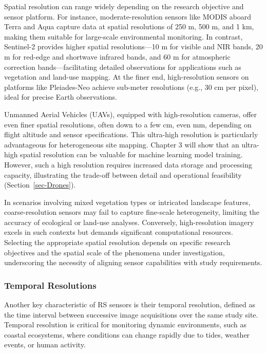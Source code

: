 \documentclass[
  letterpaper,
  11pt,
  english,
  singlespacing,
  headsepline]{MastersDoctoralThesis}
\begin{document}
\begin{spacing}{1.5}
Spatial resolution can range widely depending on the research objective
and sensor platform. For instance, moderate-resolution sensors like
MODIS aboard Terra and Aqua capture data at spatial resolutions of 250
m, 500 m, and 1 km, making them suitable for large-scale environmental
monitoring. In contrast, Sentinel-2 provides higher spatial
resolutions---10 m for visible and NIR bands, 20 m for red-edge and
shortwave infrared bands, and 60 m for atmospheric correction
bands---facilitating detailed observations for applications such as
vegetation and land-use mapping. At the finer end, high-resolution
sensors on platforms like Pleiades-Neo achieve sub-meter resolutions
(e.g., 30 cm per pixel), ideal for precise Earth observations.

Unmanned Aerial Vehicles (UAVs), equipped with high-resolution cameras,
offer even finer spatial resolutions, often down to a few cm, even mm,
depending on flight altitude and sensor specifications. This ultra-high
resolution is particularly advantageous for heterogeneous site mapping.
Chapter 3 will show that an ultra-high spatial resolution can be
valuable for machine learning model training. However, such a high
resolution requires increased data storage and processing capacity,
illustrating the trade-off between detail and operational feasibility
(Section~\ref{sec-Drones}).

In scenarios involving mixed vegetation types or intricated landscape
features, coarse-resolution sensors may fail to capture fine-scale
heterogeneity, limiting the accuracy of ecological or land-use analyses.
Conversely, high-resolution imagery excels in such contexts but demands
significant computational resources. Selecting the appropriate spatial
resolution depends on specific research objectives and the spatial scale
of the phenomena under investigation, underscoring the necessity of
aligning sensor capabilities with study requirements.

\subsubsection{Temporal Resolutions}\label{temporal-resolutions}

Another key characteristic of RS sensors is their temporal resolution,
defined as the time interval between successive image acquisitions over
the same study site. Temporal resolution is critical for monitoring
dynamic environments, such as coastal ecosystems, where conditions can
change rapidly due to tides, weather events, or human activity.


\end{spacing}
\end{document}
